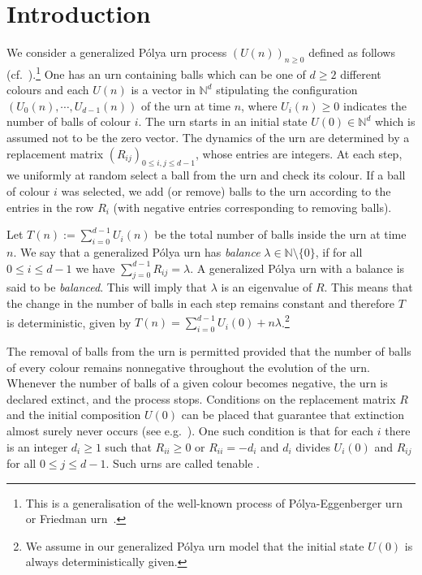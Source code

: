 \documentclass[12pt]{amsart}
\theoremstyle{definition}
\theoremstyle{remark}
\newcommand{\NN}{\mathbb{N}}
\begin{document}
\section{Introduction}

We consider a generalized P\'olya urn process $(U(n))_{n\geq 0}$ defined as follows (cf.\ \cite{janson2004functional}).\footnote{This is a generalisation of the well-known process of P\'olya-Eggenberger urn~\cite{EggenbergerPolya1923} or Friedman urn~\cite{Friedman1949}.} One has an urn containing balls which can be one of $d\geq 2$ different colours and each $U(n)$ is a vector in $\NN^d$ stipulating the configuration $(U_0(n), \cdots, U_{d-1}(n))$ of the urn at time $n$, where $U_i(n)\geq 0$ indicates the number of balls of colour $i$. The urn starts in an initial state $U(0)\in \NN^d$ which is assumed not to be the zero vector. The dynamics of the urn are determined by a replacement matrix $(R_{ij})_{0\leq i,j\leq d-1}$, whose entries are integers. At each step, we uniformly at random select a ball from the urn and check its colour. If a ball of colour $i$ was selected, we add (or remove) balls to the urn according to the entries in the row $R_i$ (with negative entries corresponding to removing balls). 

Let $T(n):=\sum_{i=0}^{d-1}U_i(n)$ be the total number of balls inside the urn at time $n$. We say that a generalized P\'olya urn has \emph{balance} $\lambda \in \NN\setminus \{0\}$, if for all $0\leq i\leq d-1$ we have $\sum_{j=0}^{d-1} R_{ij}=\lambda$. A generalized P\'olya urn with a balance is said to be \emph{balanced}. This will imply that $\lambda$ is an eigenvalue of $R$. This means that the change in the number of balls in each step remains constant and therefore $T$ is deterministic, given by $T(n)=\sum_{i=0}^{d-1}U_i(0) + n\lambda$.\footnote{We assume in our generalized P\'olya urn model that the initial state $U(0)$ is always deterministically given.}

The removal of balls from the urn is permitted provided that the number of balls of every colour remains nonnegative throughout the evolution of the urn. Whenever the number of balls of a given colour becomes negative, the urn is declared extinct, and the process stops. Conditions on the replacement matrix $R$ and the initial composition $U(0)$ can be placed that guarantee that extinction almost surely never occurs (see e.g.\ \cite{Mahmoud2009}). One such condition is that for each $i$ there is an integer $d_i \ge 1$ such that $R_{ii}\ge 0$ or $R_{ii}=-d_i$ and $d_i$ divides $U_i(0)$ and $R_{ij}$ for all $0\le j\le d-1$. Such urns are called tenable \cite{bagchi1985asymptotic}.\\
\end{document}
